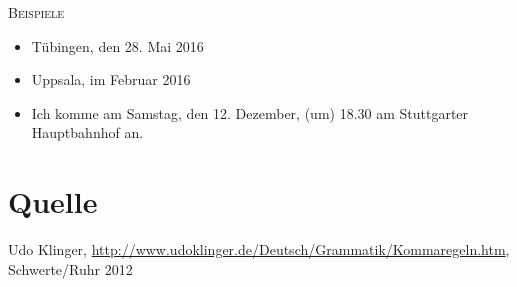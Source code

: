 \documentclass[landscape]{article}
\begin{document}
\begin{multicols*}{3}
    \textsc{Beispiele}\\
    \begin{itemize} 
        \item Tübingen, den 28. Mai 2016
        \item Uppsala, im Februar 2016
        \item Ich komme am Samstag, den 12. Dezember, (um) 18.30 am Stuttgarter Hauptbahnhof an.
    \end{itemize}

    \section*{Quelle}
    Udo Klinger, \url{http://www.udoklinger.de/Deutsch/Grammatik/Kommaregeln.htm}, Schwerte/Ruhr 2012


\end{multicols*}
\end{document}
